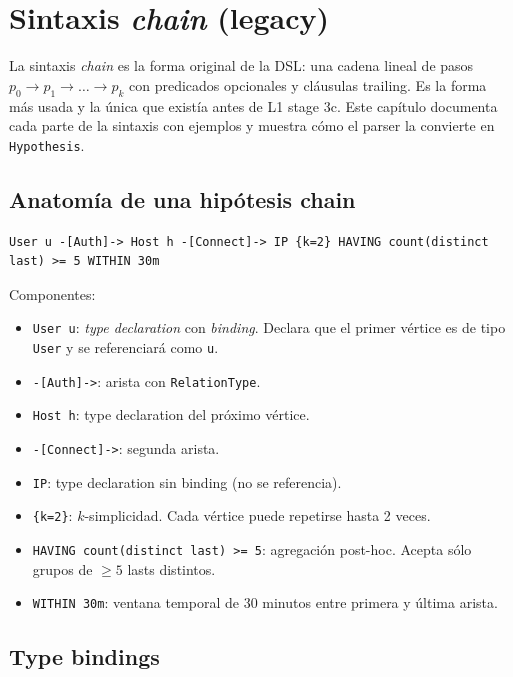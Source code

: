 \chapter{Sintaxis \emph{chain} (legacy)}
\label{cap:dsl-chain}

\begin{intuicion}
La sintaxis \emph{chain} es la forma original de la DSL: una
cadena lineal de pasos \(p_0 \to p_1 \to \dots \to p_k\) con
predicados opcionales y cláusulas trailing. Es la forma más usada
y la única que existía antes de L1 stage 3c. Este capítulo
documenta cada parte de la sintaxis con ejemplos y muestra cómo el
parser la convierte en \texttt{Hypothesis}.
\end{intuicion}

\section{Anatomía de una hipótesis chain}

\begin{lstlisting}
User u -[Auth]-> Host h -[Connect]-> IP {k=2} HAVING count(distinct last) >= 5 WITHIN 30m
\end{lstlisting}

\noindent
Componentes:

\begin{itemize}
    \item \texttt{User u}: \emph{type declaration} con
    \emph{binding}. Declara que el primer vértice es de tipo
    \texttt{User} y se referenciará como \texttt{u}.
    \item \texttt{-[Auth]->}: arista con \texttt{RelationType}.
    \item \texttt{Host h}: type declaration del próximo vértice.
    \item \texttt{-[Connect]->}: segunda arista.
    \item \texttt{IP}: type declaration sin binding (no se
    referencia).
    \item \texttt{\{k=2\}}: \(k\)-simplicidad. Cada vértice puede
    repetirse hasta 2 veces.
    \item \texttt{HAVING count(distinct last) >= 5}: agregación
    post-hoc. Acepta sólo grupos de \(\geq 5\) lasts distintos.
    \item \texttt{WITHIN 30m}: ventana temporal de 30 minutos
    entre primera y última arista.
\end{itemize}

\section{Type bindings}

